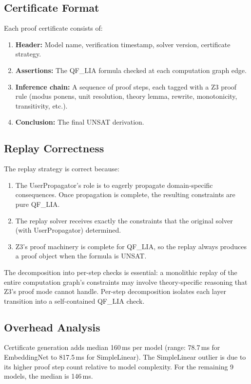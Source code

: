 \documentclass[11pt]{article}
\begin{document}
\subsection{Certificate Format}

Each proof certificate consists of:
\begin{enumerate}[leftmargin=2em]
  \item \textbf{Header:} Model name, verification timestamp,
    solver version, certificate strategy.
  \item \textbf{Assertions:} The QF\_LIA formula checked at each
    computation graph edge.
  \item \textbf{Inference chain:} A sequence of proof steps, each
    tagged with a Z3 proof rule (modus ponens, unit resolution,
    theory lemma, rewrite, monotonicity, transitivity, etc.).
  \item \textbf{Conclusion:} The final UNSAT derivation.
\end{enumerate}

\subsection{Replay Correctness}

The replay strategy is correct because:
\begin{enumerate}[leftmargin=2em]
  \item The UserPropagator's role is to eagerly propagate
    domain-specific consequences.  Once propagation is complete,
    the resulting constraints are pure QF\_LIA.
  \item The replay solver receives exactly the constraints that
    the original solver (with UserPropagator) determined.
  \item Z3's proof machinery is complete for QF\_LIA, so the
    replay always produces a proof object when the formula is UNSAT.
\end{enumerate}

The decomposition into per-step checks is essential: a monolithic
replay of the entire computation graph's constraints may involve
theory-specific reasoning that Z3's proof mode cannot handle.
Per-step decomposition isolates each layer transition into a
self-contained QF\_LIA check.

\subsection{Overhead Analysis}

Certificate generation adds median 160\,ms per model (range:
78.7\,ms for EmbeddingNet to 817.5\,ms for SimpleLinear).
The SimpleLinear outlier is due to its higher proof step count
relative to model complexity.  For the remaining 9 models,
the median is 146\,ms.
\end{document}
